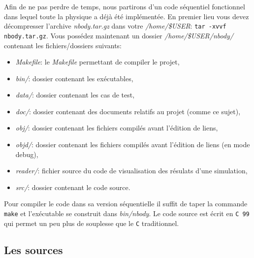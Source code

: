 Afin de ne pas perdre de temps, nous partirons d'un code séquentiel fonctionnel dans lequel toute la physique a déjà été implémentée.
En premier lieu vous devez décompresser l'archive \textit{nbody.tar.gz} dans votre \textit{/home/\$USER}:
\texttt{tar -xvvf nbody.tar.gz}.
Vous possédez maintenant un dossier \textit{/home/\$USER/nbody/} contenant les fichiers/dossiers suivants:
\begin{itemize}
\item \textit{Makefile}: le \textit{Makefile} permettant de compiler le projet,
\item \textit{bin/}: dossier contenant les exécutables,
\item \textit{data/}: dossier contenant les cas de test,
\item \textit{doc/}: dossier contenant des documents relatifs au projet (comme ce sujet),
\item \textit{obj/}: dossier contenant les fichiers compilés avant l'édition de liens,
\item \textit{objd/}: dossier contenant les fichiers compilés avant l'édition de liens (en mode debug),
\item \textit{reader/}: fichier source du code de visualisation des résulats d'une simulation,
\item \textit{src/}: dossier contenant le code source.
\end{itemize}
Pour compiler le code dans sa version séquentielle il suffit de taper la commande \texttt{make} et l'exécutable se construit dans \textit{bin/nbody}.
Le code source est écrit en \texttt{C 99} qui permet un peu plus de souplesse que le \texttt{C} traditionnel.

\subsection{Les sources}

